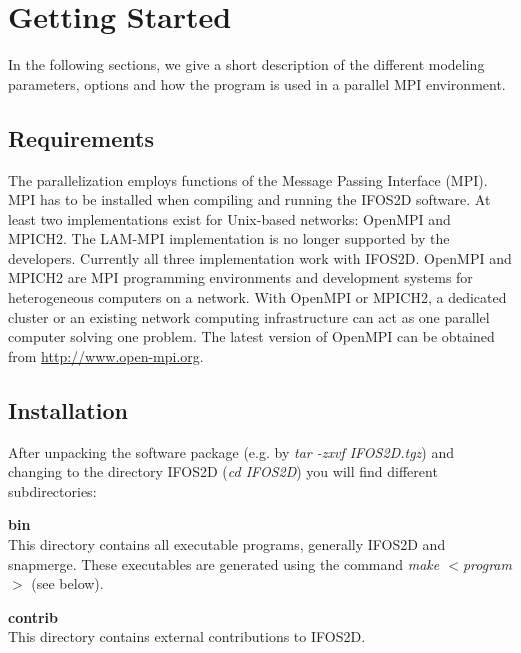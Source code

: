 
\chapter{\label{cha:Getting-Started}Getting Started}


In the following sections, we give a short description of the different modeling  parameters, options and how the program is used in a parallel MPI environment.

\section{Requirements}
The parallelization employs functions of the Message Passing Interface (MPI). MPI has to be installed when compiling and running the IFOS2D software. At least two implementations exist for Unix-based networks: OpenMPI and MPICH2. The LAM-MPI implementation is no longer supported by the developers. Currently all three implementation work with IFOS2D. OpenMPI and MPICH2 are MPI programming environments and development systems for heterogeneous computers on a network. With OpenMPI or MPICH2, a dedicated cluster or an existing network computing  infrastructure can act as one parallel computer solving one problem. The latest version of OpenMPI can be obtained from \href{http://www.open-mpi.org}{http://www.open-mpi.org}.%


\section{Installation}
\label{installation}
After unpacking the software package (e.g. by \textit{tar -zxvf IFOS2D.tgz}) and changing to the directory IFOS2D (\textit{cd IFOS2D})  you will find different subdirectories:

\textbf{bin}\\
This directory contains all executable programs, generally IFOS2D and snapmerge. These executables are generated using the command \textit{make $<$program$>$} (see below).

\textbf{contrib}\\
This directory contains external contributions to IFOS2D.

